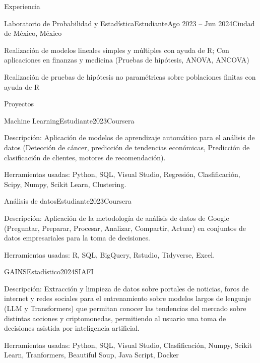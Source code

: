 \documentclass[]{kyvernitis-resume}
\begin{document}
\begin{section}{Experiencia}
\begin{subsection}{Laboratorio de Probabilidad y Estadística}{Estudiante}{Ago 2023 -- Jun 2024}{Ciudad de México, México}
		\item Realización de modelos lineales simples y múltiples con ayuda de R; Con aplicaciones en finanzas y medicina (Pruebas de hipótesis, ANOVA, ANCOVA)
		
		\item Realización de pruebas de hipótesis no paramétricas sobre poblaciones finitas con ayuda de R 
	\end{subsection}
    
    
\end{section}

\begin{section}{Proyectos}
\begin{subsectionnobullet}{Machine Learning}{Estudiante}{2023}{Coursera}
    \item Descripción: Aplicación de modelos de aprendizaje automático para el análisis de datos (Detección de cáncer, predicción de tendencias económicas, Predicción de clasificación de clientes, motores de recomendación).
    \item Herramientas usadas: Python, SQL, Visual Studio, Regresión, Clasfificación, Scipy, Numpy, Scikit Learn, Clustering.
\end{subsectionnobullet}

\begin{subsectionnobullet}{Análisis de datos}{Estudiante}{2023}{Coursera}
    \item Descripción: Aplicación de la metodología de análisis de datos de Google (Preguntar, Preparar, Procesar, Analizar, Compartir, Actuar) en conjuntos de datos empresariales para la toma de decisiones.
    \item Herramientas usadas: R, SQL, BigQuery, Rstudio, Tidyverse, Excel.
\end{subsectionnobullet}

\newpage

\begin{subsectionnobullet}{GAINS}{Estadístico}{2024}{SIAFI}
	\item Descripción: Extracción y limpieza de datos sobre portales de noticias, foros de internet y redes sociales para el entrenamiento sobre modelos largos de lenguaje (LLM y Transformers) que permitan conocer las tendencias del mercado sobre distintas acciones y criptomonedas, permitiendo al usuario una toma de decisiones asistida por inteligencia artificial.
	\item Herramientas usadas: Python, SQL, Visual Studio, Clasfificación, Numpy, Scikit Learn, Tranformers, Beautiful Soup, Java Script, Docker
\end{subsectionnobullet}

\end{section}
\end{document}
